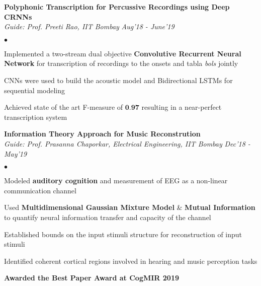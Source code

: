 \documentclass[margin,line, 9pt]{res}
\newenvironment{list2}{
  \begin{list}{$\bullet$}{%
      \setlength{\itemsep}{0.03in}
      \setlength{\parsep}{0in} \setlength{\parskip}{0in}
      \setlength{\topsep}{0in} \setlength{\partopsep}{0in} 
      \setlength{\leftmargin}{0.2in}}}{\end{list}}
\begin{document}
%
{\bf Polyphonic Transcription for Percussive Recordings using Deep CRNNs} \\
{\em Guide: Prof. Preeti Rao, IIT Bombay} \hfill {\it Aug'18 - June'19}\\
\vspace*{-.13in}
\begin{list2}
\item Implemented a two-stream dual objective \textbf{Convolutive Recurrent Neural Network} for transcription of recordings to the onsets and tabla \textit{bols} jointly
\item CNNs were used to build the acoustic model and Bidirectional LSTMs for sequential modeling
\item Achieved state of the art F-measure of $\textbf{0.97}$ resulting in a near-perfect transcription system
\end{list2}
%
{\bf Information Theory Approach for Music Reconstrution} \\
{\em Guide: Prof. Prasanna Chaporkar, Electrical Engineering, IIT Bombay} \hfill {\it Dec'18 - May'19}\\
\vspace*{-.13in}
\begin{list2}
\item Modeled \textbf{auditory cognition} and measurement of EEG as a non-linear communication channel
\item Used \textbf{Multidimensional Gaussian Mixture Model} \& \textbf{Mutual Information} to quantify neural information transfer and capacity of the channel
\item Established bounds on the input stimuli structure for reconstruction of input stimuli
\item Identified coherent cortical regions involved in hearing and music perception tasks
\item \textbf{Awarded the Best Paper Award at CogMIR 2019}
\end{list2}
\end{document}

